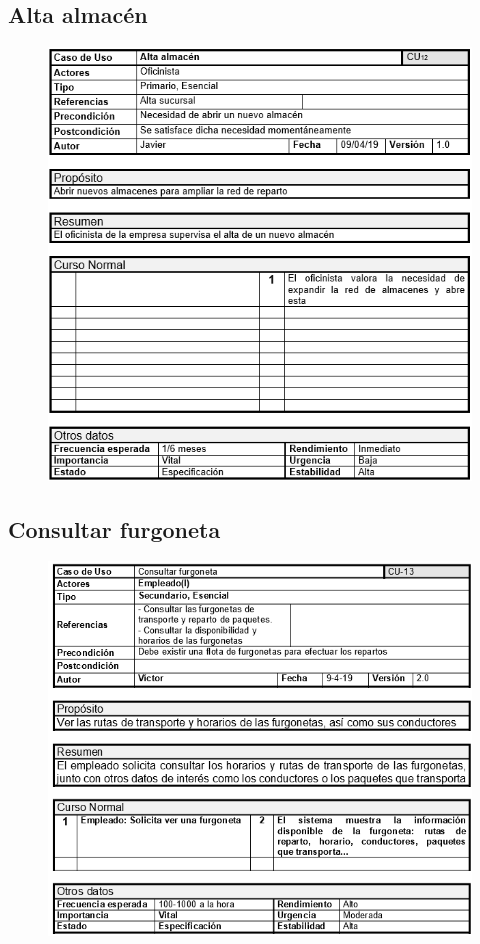 \subsection{Alta almacén}
\begin{figure}[H]
	\centering
	\includegraphics[width=16cm]{12}
\end{figure}
\subsection{Consultar furgoneta}
\begin{figure}[H]
	\centering
	\includegraphics[width=16cm]{13}
\end{figure}
